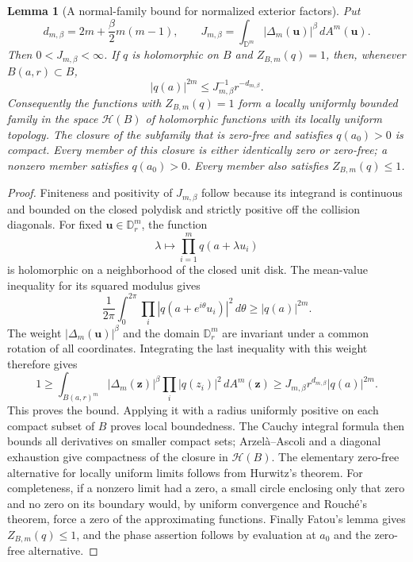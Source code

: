 \documentclass[11pt,a4paper]{article}
\numberwithin{equation}{section}
\newtheorem{lemma}[theorem]{Lemma}
\theoremstyle{definition}
\theoremstyle{remark}
\newcommand{\D}{\mathbb D}
\begin{document}
\begin{lemma}[A normal-family bound for normalized exterior factors]
\label{lem:normalized-exterior-normal-family}
Put
\[
 d_{m,\beta}=2m+\frac\beta2m(m-1),\qquad
 J_{m,\beta}=\int_{\D^m}|\Delta_m(\mathbf u)|^\beta\,dA^m(\mathbf u).
\]
Then $0<J_{m,\beta}<\infty$. If $q$ is holomorphic on $B$ and
$Z_{B,m}(q)=1$, then, whenever $B(a,r)\subset B$,
\begin{equation}\label{eq:normalized-exterior-point-bound}
 |q(a)|^{2m}\le J_{m,\beta}^{-1}r^{-d_{m,\beta}}.
\end{equation}
Consequently the functions with $Z_{B,m}(q)=1$ form a locally uniformly
bounded family in the space $\mathcal H(B)$ of holomorphic functions
with its locally uniform topology. The closure of the subfamily that
is zero-free and satisfies $q(a_0)>0$ is compact. Every member of this
closure is either identically zero or zero-free; a nonzero member
satisfies $q(a_0)>0$. Every member also satisfies $Z_{B,m}(q)\le1$.
\end{lemma}

\begin{proof}
Finiteness and positivity of $J_{m,\beta}$ follow because its integrand
is continuous and bounded on the closed polydisk and strictly positive
off the collision diagonals. For fixed $\mathbf u\in\D_r^m$, the
function
\[
 \lambda\longmapsto\prod_{i=1}^m q(a+\lambda u_i)
\]
is holomorphic on a neighborhood of the closed unit disk. The
mean-value inequality for its squared modulus gives
\[
 \frac1{2\pi}\int_0^{2\pi}
        \prod_i|q(a+e^{i\theta}u_i)|^2\,d\theta
       \ge |q(a)|^{2m}.
\]
The weight $|\Delta_m(\mathbf u)|^\beta$ and the domain $\D_r^m$
are invariant under a common rotation of all coordinates. Integrating
the last inequality with this weight therefore gives
\[
 1\ge\int_{B(a,r)^m}|\Delta_m(\mathbf z)|^\beta
                          \prod_i|q(z_i)|^2\,dA^m(\mathbf z)
       \ge J_{m,\beta}r^{d_{m,\beta}}|q(a)|^{2m}.
\]
This proves the bound. Applying it with a radius uniformly positive on
each compact subset of $B$ proves local boundedness. The Cauchy
integral formula then bounds all derivatives on smaller compact sets;
Arzel\`a--Ascoli and a diagonal exhaustion give compactness of the
closure in $\mathcal H(B)$. The elementary zero-free alternative for
locally uniform limits follows from Hurwitz's theorem. For completeness,
if a nonzero limit had a zero, a small circle enclosing only that zero
and no zero on its boundary would, by uniform convergence and Rouch\'e's
theorem, force a zero of the approximating functions. Finally Fatou's
lemma gives $Z_{B,m}(q)\le1$, and the phase assertion follows by
evaluation at $a_0$ and the zero-free alternative.
\end{proof}
\end{document}
